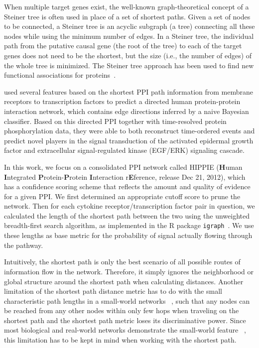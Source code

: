 When multiple target genes exist, the well-known graph-theoretical concept of a Steiner tree is often used in place of a set of shortest paths. Given a set of nodes to be connected, a Steiner tree is an acyclic subgraph (a tree) connecting all these nodes while using the minimum number of edges. In a Steiner tree, the individual path from the putative causal gene (the root of the tree) to each of the target genes does not need to be the shortest, but the size (i.e., the number of edges) of the whole tree is minimized. The Steiner tree approach has been used to find new functional associations for proteins~\citep{Huang2009,Bailly-Bechet2011}.

\cite{Vinayagam2011} used several features based on the shortest PPI path 
information from membrane receptors to transcription factors to
predict a directed human protein-protein interaction 
network, which contains edge directions
inferred by a naive Bayesian classifier.
Based on this directed PPI together with time-resolved protein phosphorylation data,
they were able to both reconstruct time-ordered events and
predict novel players in the signal transduction of the activated epidermal growth factor and extracellular signal-regulated kinase (EGF/ERK) signaling cascade.

In this work, we focus on a consolidated PPI network called HIPPIE 
(\textbf{H}uman \textbf{I}ntegrated \textbf{P}rotein-\textbf{P}rotein 
\textbf{I}nteraction r\textbf{E}ference, release Dec 21, 2012), 
which has a confidence scoring 
scheme that reflects the amount and quality of evidence for a given PPI. 
We first determined an appropriate cutoff score to prune the network.
Then for each cytokine receptor/transcription factor pair in question,
we calculated the length of the shortest path between the two
using the unweighted breadth-first search algorithm,
as implemented in the R package \texttt{igraph}~\citep{Csardi2006}.
We use these lengths as base metric for the probability 
of signal actually flowing through the pathway.

Intuitively, the shortest path is only the best scenario of all possible routes
of information flow in the network. Therefore, it simply ignores the 
neighborhood or global structure around the shortest path when calculating
distances. Another limitation of the shortest path distance metric has to do
with the small characteristic path lengths in a small-world networks~%
\citep{Watts1998}, such that any nodes can be reached from any other nodes
within only few hops when traveling on the shortest path and the shortest path
metric loses its discriminative power. Since most biological
and real-world networks demonstrate the small-world feature~%
\citep{Barabasi2004}, this limitation
has to be kept in mind when working with the shortest path.

